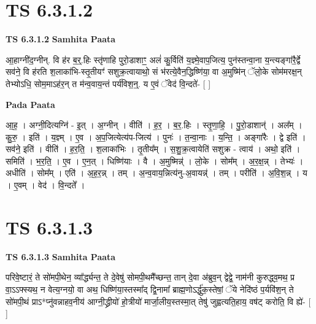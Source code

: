 \documentclass[17pt]{extarticle}
\begin{document}
\section*{ TS 6.3.1.2 }

\textbf{TS 6.3.1.2 } \newline
\textbf{Samhita Paata} \newline

आ॒हाग्नी॑द॒ग्नीन्. वि ह॑र ब॒र्॒.हिः स्तृ॑णाहि पुरो॒डाशाꣳ॒॒ अलं॑ कु॒र्विति॑ य॒ज्ञ्मे॒वाप॒जित्य॒ पुन॑स्तन्वा॒ना य॒न्त्यङ्गा॑रै॒र्द्वे सव॑ने॒ वि ह॑रति श॒लाका॑भि-स्तृ॒तीयꣳ॑ सशुक्र॒त्वायाथो॒ सं भ॑रत्ये॒वैन॒द्धिष्णि॑या॒ वा अ॒मुष्मि॑न् ॅलो॒के सोम॑मरक्ष॒न् तेभ्योऽधि॒ सोम॒माऽह॑र॒न् त म॑न्व॒वाय॒न्तं पर्य॑विश॒न्॒. य ए॒वं ॅवेद॑ वि॒न्दते॑- [  ] \newline

\textbf{Pada Paata} \newline

आ॒ह॒ । अग्नी॒दित्यग्नि॑ - इ॒त् । अ॒ग्नीन् । वीति॑ । ह॒र॒ । ब॒र॒.हिः । स्तृ॒णा॒हि॒ । पु॒रो॒डाशान्॑ । अल᳚म् । कु॒रु॒ । इति॑ । य॒ज्ञ्म् । ए॒व । अ॒प॒जित्येत्य॑प-जित्य॑ । पुनः॑ । त॒न्वा॒नाः । य॒न्ति॒ । अङ्गा॑रैः । द्वे इति॑ । सव॑ने॒ इति॑ । वीति॑ । ह॒र॒ति॒ । श॒लाका॑भिः । तृ॒तीय᳚म् । स॒शु॒क्र॒त्वायेति॑ सशुक्र - त्वाय॑ । अथो॒ इति॑ । समिति॑ । भ॒र॒ति॒ । ए॒व । ए॒न॒त् । धिष्णि॑याः । वै । अ॒मुष्मिन्न्॑ । लो॒के । सोम᳚म् । अ॒र॒क्ष॒न्न् । तेभ्यः॑ । अधीति॑ । सोम᳚म् । एति॑ । अ॒ह॒र॒न्न् । तम् । अ॒न्व॒वाय॒न्नित्य॑नु-अ॒वायन्न्॑ । तम् । परीति॑ । अ॒वि॒श॒न्न् । य । ए॒वम् । वेद॑ । वि॒न्दते᳚ ।  \newline




\section*{ TS 6.3.1.3 }

\textbf{TS 6.3.1.3 } \newline
\textbf{Samhita Paata} \newline

परिवे॒ष्टारं॒ ते सो॑मपी॒थेन॒ व्या᳚र्द्ध्यन्त॒ ते दे॒वेषु॑ सोमपी॒थमै᳚च्छन्त॒ तान् दे॒वा अ॑ब्रुव॒न् द्वेद्वे॒ नाम॑नी कुरुद्ध्व॒मथ॒ प्र वा॒ऽऽफ्स्यथ॒ न वेत्य॒ग्नयो॒ वा अथ॒ धिष्णि॑या॒स्तस्मा᳚द् द्वि॒नामा᳚ ब्राह्म॒णोऽर्द्धु॑क॒स्तेषां॒ ॅये नेदि॑ष्ठं प॒र्यवि॑श॒न् ते सो॑मपी॒थं प्राऽ*प्नु॑वन्नाहव॒नीय॑ आग्नी॒द्ध्रीयो॑ हो॒त्रीयो॑ मार्जा॒लीय॒स्तस्मा॒त् तेषु॑ जुह्वत्यति॒हाय॒ वष॑ट् करोति॒ वि ह्ये॑- [  ] \newline
\end{document}
